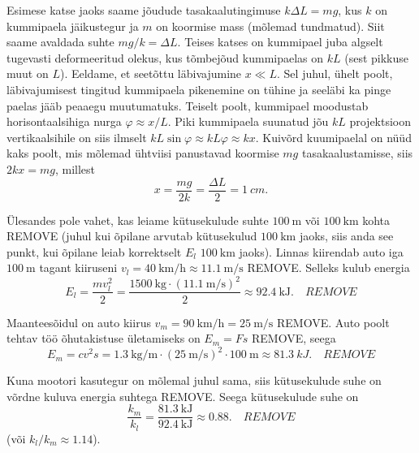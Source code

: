 \documentclass[10pt]{article}
\newcommand{\p}[1]{REMOVE}
\begin{document}

\solu
Esimese katse jaoks saame jõudude tasakaalutingimuse $k\Delta L=mg$, kus $k$ on kummipaela jäikustegur ja $m$ on koormise mass (mõlemad tundmatud). Siit saame avaldada suhte $mg/k=\Delta L$. Teises katses on kummipael juba algselt tugevasti deformeeritud olekus, kus tõmbejõud kummipaelas on $kL$ (sest pikkuse muut on $L$). Eeldame, et seetõttu läbivajumine $x\ll L$. Sel juhul, ühelt poolt, läbivajumisest tingitud kummipaela pikenemine on tühine ja seeläbi ka pinge paelas jääb peaaegu muutumatuks. Teiselt poolt, kummipael moodustab horisontaalsihiga nurga $\varphi\approx x/L$. Piki kummipaela suunatud jõu $kL$ projektsioon vertikaalsihile on siis ilmselt $kL\sin\varphi\approx kL\varphi\approx kx$. Kuivõrd kuumipaelal on nüüd kaks poolt, mis mõlemad ühtviisi panustavad koormise $mg$ tasakaalustamisse, siis $2kx=mg$, millest
\[
x =\frac{mg}{2k} =\frac{\Delta L}{2} = \SI{1}{cm}.
\]
\probend
\bigskip


\solu
Ülesandes pole vahet, kas leiame kütusekulude suhte $\SI{100}{\m}$ või $\SI{100}{\km}$ kohta \p{1} (juhul kui õpilane arvutab kütusekulud $\SI{100}{\km}$ jaoks, siis anda see punkt, kui õpilane leiab korrektselt $E_l$ $\SI{100}{\km}$ jaoks). Linnas kiirendab auto iga $\SI{100}{\m}$ tagant kiiruseni $v_l = \SI{40}{\km\per\hour} \approx \SI{11.1}{\m\per\s}$ \p{1}. Selleks kulub energia
\begin{equation*}
    E_l = \frac{mv_l^2}{2} = \frac{\SI{1500}{\kg}\cdot (\SI{11.1}{\m\per\s})^2}{2} \approx \SI{92.4}{\kJ}. \quad \p{1}
\end{equation*}

Maanteesõidul on auto kiirus $v_m = \SI{90}{\km\per\hour} = \SI{25}{\m\per\s}$ \p{1}. Auto poolt tehtav töö õhutakistuse ületamiseks on $E_m = Fs$ \p{1}, seega
\begin{equation*}
    E_m = cv^2s = \SI{1.3}{\kg\per\m}\cdot \left(\SI{25}{\m\per\s}\right)^2 \cdot \SI{100}{\m} \approx \SI{81.3}{kJ}.\quad \p{1}
\end{equation*}

Kuna mootori kasutegur on mõlemal juhul sama, siis kütusekulude suhe on võrdne kuluva energia suhtega \p{1}. Seega kütusekulude suhe on
\begin{equation*}
    \frac{k_m}{k_l} = \frac{\SI{81.3}{\kJ}}{\SI{92.4}{\kJ}} \approx \num{0.88}. \quad\p{1}
\end{equation*}
(või $k_l/k_m \approx \num{1.14}$).
\probend
\bigskip
\end{document}
